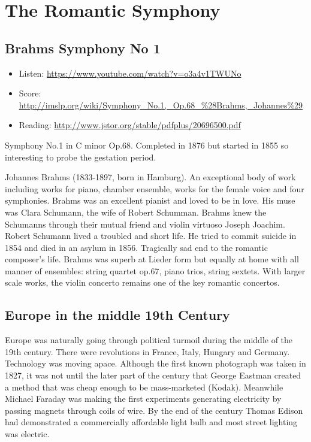 
\chapter{The Romantic Symphony}
\label{romanticsymphony}


\section{Brahms Symphony No 1 }
\begin{itemize}
\item Listen: \url{https://www.youtube.com/watch?v=o3a4v1TWUNo}
\item Score: \url{http://imslp.org/wiki/Symphony_No.1,_Op.68_%28Brahms,_Johannes%29}
\item Reading: \url{http://www.jstor.org/stable/pdfplus/20696500.pdf}
\end{itemize}

Symphony No.1 in C minor Op.68. Completed in 1876 but started in 1855 so interesting to probe the gestation period. 

Johannes Brahms (1833-1897, born in Hamburg). An exceptional body of work including works for piano, chamber ensemble, works for the female voice and four symphonies. Brahms was an excellent pianist and loved to be in love. His muse was Clara Schumann, the wife of Robert Schumman. Brahms knew the Schumanns through their mutual friend and violin virtuoso Joseph Joachim. Robert Schumann lived a troubled and short life. He tried to commit suicide in 1854 and died in an asylum in 1856. Tragically sad end to the romantic composer's life. Brahms was superb at Lieder form but equally at home with all manner of ensembles: string quartet op.67, piano trios, string sextets. With larger scale works, the violin concerto remains one of the key romantic concertos. 

\section{Europe in the middle 19th Century}
Europe was naturally going through political turmoil during the middle of the 19th century. There were revolutions in France, Italy, Hungary and Germany. Technology was moving apace. Although the first known photograph was taken in 1827, it was not until the later part of the century that George Eastman created a method that was cheap enough to be mass-marketed (Kodak). Meanwhile Michael Faraday was making the first experiments generating electricity by passing magnets through coils of wire. By the end of the century Thomas Edison had demonstrated a commercially affordable light bulb and most street lighting was electric. 

